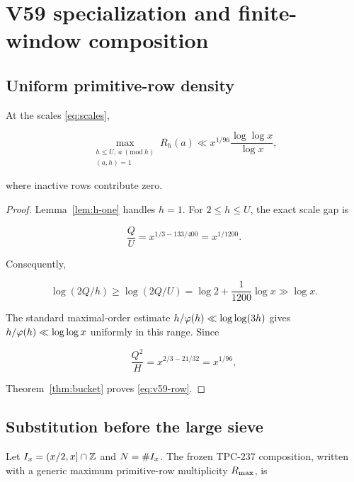 \section{V59 specialization and finite-window composition}
\label{sec:composition}

\subsection{Uniform primitive-row density}

\begin{corollary}
\label{cor:v59-row}
At the scales \eqref{eq:scales},

\begin{equation}
 \max_{\substack{h\leq U,\ a\ (\mathrm{mod}\ h)\\(a,h)=1}}
 R_h(a)
 \ll x^{1/96}\frac{\log\log x}{\log x},
 \label{eq:v59-row}
\end{equation}

where inactive rows contribute zero.
\end{corollary}

\begin{proof}
Lemma~\ref{lem:h-one} handles $h=1$.  For $2\leq h\leq U$, the exact
scale gap is

\begin{equation}
 \frac QU=x^{1/3-133/400}=x^{1/1200}.
 \label{eq:q-over-u}
\end{equation}

Consequently,

\[
 \log(2Q/h)\geq\log(2Q/U)
 =\log2+\frac{1}{1200}\log x\gg\log x.
\]

The standard maximal-order estimate
$h/\varphi(h)\ll\log\log(3h)$ gives
$h/\varphi(h)\ll\log\log x$ uniformly in this range.  Since

\begin{equation}
 \frac{Q^2}{H}=x^{2/3-21/32}=x^{1/96},
 \label{eq:q2h}
\end{equation}

Theorem~\ref{thm:bucket} proves \eqref{eq:v59-row}.
\end{proof}

\subsection{Substitution before the large sieve}

Let $I_x=(x/2,x]\cap\mathbb Z$ and $N=\#I_x$.  The frozen TPC-237 composition,
written with a generic maximum primitive-row multiplicity $R_{\max}$, is

